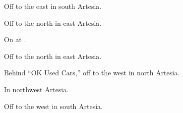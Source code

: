 
\begin{LocationList}

Off  to the east in south Artesia.

Off  to the north in east Artesia.

\Location{\GasStation \Gas}
On  at .

Off  to the north in east Artesia.

\Location{\RestArea \Rest}
Behind “OK Used Cars,” off  to the west in north Artesia.

In northwest Artesia.

\Location{\TruckService \Service}
Off  to the west in south Artesia.

\end{LocationList}
